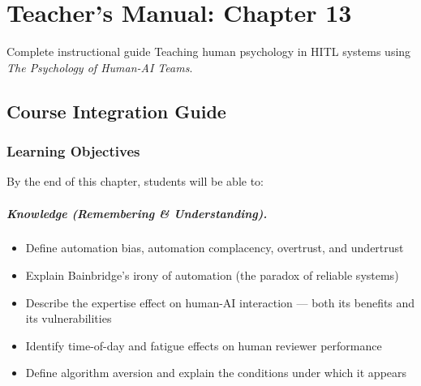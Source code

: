 
\chapter{Teacher's Manual: Chapter 13}
\label{ch:teacher-ch13}

\begin{chapterquote}{Complete instructional guide}
Teaching human psychology in HITL systems using \emph{The Psychology of Human-AI Teams}.
\end{chapterquote}

\section{Course Integration Guide}

\subsection{Learning Objectives}

By the end of this chapter, students will be able to:

\paragraph{Knowledge (Remembering \& Understanding).}
\begin{itemize}
    \item Define automation bias, automation complacency, overtrust, and undertrust
    \item Explain Bainbridge's irony of automation (the paradox of reliable systems)
    \item Describe the expertise effect on human-AI interaction --- both its benefits and its vulnerabilities
    \item Identify time-of-day and fatigue effects on human reviewer performance
    \item Define algorithm aversion and explain the conditions under which it appears
\end{itemize}

